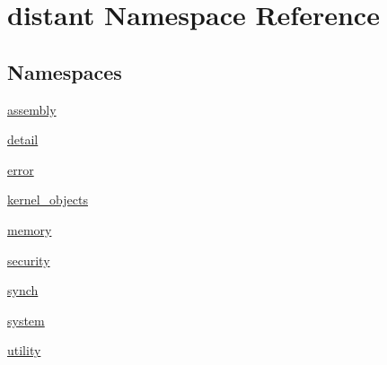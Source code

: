 \hypertarget{namespacedistant}{}\section{distant Namespace Reference}
\label{namespacedistant}
\subsection*{Namespaces}
\begin{DoxyCompactItemize}
\item 
 \mbox{\hyperlink{namespacedistant_1_1assembly}{assembly}}
\item 
 \mbox{\hyperlink{namespacedistant_1_1detail}{detail}}
\item 
 \mbox{\hyperlink{namespacedistant_1_1error}{error}}
\item 
 \mbox{\hyperlink{namespacedistant_1_1kernel__objects}{kernel\+\_\+objects}}
\item 
 \mbox{\hyperlink{namespacedistant_1_1memory}{memory}}
\item 
 \mbox{\hyperlink{namespacedistant_1_1security}{security}}
\item 
 \mbox{\hyperlink{namespacedistant_1_1synch}{synch}}
\item 
 \mbox{\hyperlink{namespacedistant_1_1system}{system}}
\item 
 \mbox{\hyperlink{namespacedistant_1_1utility}{utility}}
\end{DoxyCompactItemize}
